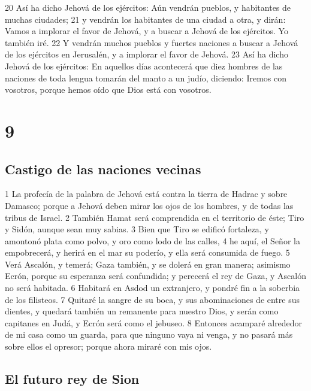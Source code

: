 20 Así ha dicho Jehová de los ejércitos: Aún vendrán pueblos, y habitantes de muchas ciudades;
21 y vendrán los habitantes de una ciudad a otra, y dirán: Vamos a implorar el favor de Jehová, y a buscar a Jehová de los ejércitos. Yo también iré.
22 Y vendrán muchos pueblos y fuertes naciones a buscar a Jehová de los ejércitos en Jerusalén, y a implorar el favor de Jehová.
23 Así ha dicho Jehová de los ejércitos: En aquellos días acontecerá que diez hombres de las naciones de toda lengua tomarán del manto a un judío, diciendo: Iremos con vosotros, porque hemos oído que Dios está con vosotros.

\chapter{9}

\section*{Castigo de las naciones vecinas}

1 La profecía de la palabra de Jehová está contra la tierra de Hadrac y sobre Damasco; porque a Jehová deben mirar los ojos de los hombres, y de todas las tribus de Israel.
2 También Hamat será comprendida en el territorio de éste; Tiro y Sidón, aunque sean muy sabias.
3 Bien que Tiro se edificó fortaleza, y amontonó plata como polvo, y oro como lodo de las calles,
4 he aquí, el Señor la empobrecerá, y herirá en el mar su poderío, y ella será consumida de fuego.
5 Verá Ascalón, y temerá; Gaza también, y se dolerá en gran manera; asimismo Ecrón, porque su esperanza será confundida; y perecerá el rey de Gaza, y Ascalón no será habitada.
6 Habitará en Asdod un extranjero, y pondré fin a la soberbia de los filisteos. 
7 Quitaré la sangre de su boca, y sus abominaciones de entre sus dientes, y quedará también un remanente para nuestro Dios, y serán como capitanes en Judá, y Ecrón será como el jebuseo.
8 Entonces acamparé alrededor de mi casa como un guarda, para que ninguno vaya ni venga, y no pasará más sobre ellos el opresor; porque ahora miraré con mis ojos.

\section*{El futuro rey de Sion}

